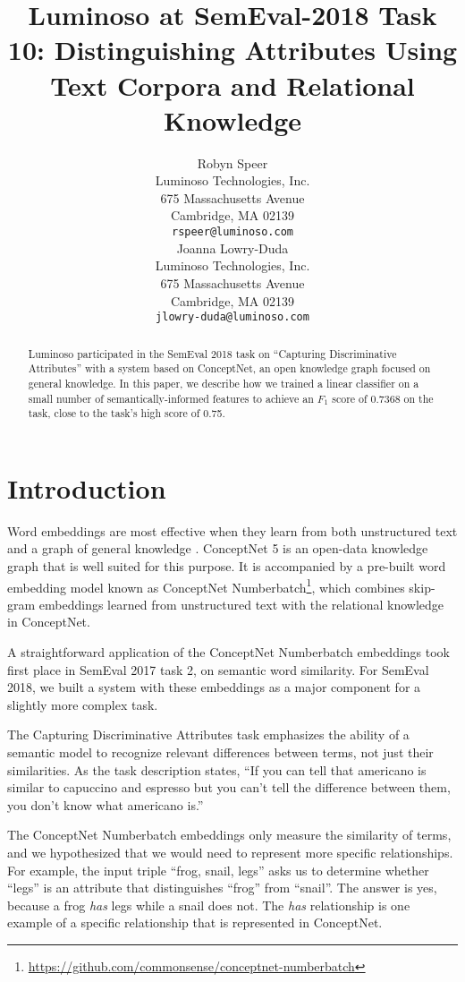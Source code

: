 \documentclass[11pt,a4paper]{article}
\title{Luminoso at SemEval-2018 Task 10: Distinguishing Attributes Using Text Corpora and Relational Knowledge}
\author{Robyn Speer \\
  Luminoso Technologies, Inc. \\
  675 Massachusetts Avenue \\
  Cambridge, MA 02139 \\
  {\tt rspeer@luminoso.com} \\\And
  Joanna Lowry-Duda \\
  Luminoso Technologies, Inc. \\
  675 Massachusetts Avenue \\
  Cambridge, MA 02139 \\
  {\tt jlowry-duda@luminoso.com} \\}
\date{}
\begin{document}
\maketitle
\begin{abstract}

    Luminoso participated in the SemEval 2018 task on ``Capturing
    Discriminative Attributes'' with a system based on ConceptNet, an open
    knowledge graph focused on general knowledge. In this paper, we describe
    how we trained a linear classifier on a small number of
    semantically-informed features to achieve an $F_1$ score of 0.7368 on the task,
    close to the task's high score of 0.75.

\end{abstract}

\newcommand{\term}[0]{$\mathit{term}$}
\newcommand{\termOne}[0]{$\mathit{term}_1$}
\newcommand{\termTwo}[0]{$\mathit{term}_2$}
\newcommand{\att}[0]{$\mathit{att}$}

\section{Introduction}

Word embeddings are most effective when they learn from both unstructured text
and a graph of general knowledge \cite{speer-lowryduda:2017:SemEval}. ConceptNet 5
\cite{speer2017conceptnet} is an open-data knowledge graph that is well suited for
this purpose. It is accompanied by a pre-built word embedding model known as
ConceptNet
Numberbatch\footnote{\url{https://github.com/commonsense/conceptnet-numberbatch}},
which combines skip-gram embeddings learned from unstructured text with the
relational knowledge in ConceptNet.

A straightforward application of the ConceptNet Numberbatch embeddings took first
place in SemEval 2017 task 2, on semantic word similarity. For SemEval 2018, we
built a system with these embeddings as a major component for a slightly more
complex task.

The Capturing Discriminative Attributes task \cite{semeval2018task10} emphasizes
the ability of a semantic model to recognize relevant differences between
terms, not just their similarities. As the task description states, ``If you
can tell that americano is similar to capuccino and espresso but you can't tell
the difference between them, you don't know what americano is.''

The ConceptNet Numberbatch embeddings only measure the similarity of terms,
and we hypothesized that we would need to represent more specific relationships.
For example, the input triple ``frog, snail, legs'' asks us to determine whether
``legs'' is an attribute that distinguishes ``frog'' from ``snail''. The answer
is yes, because a frog \emph{has} legs while a snail does not.
The \emph{has} relationship is one example of a specific relationship that is
represented in ConceptNet.
\end{document}

